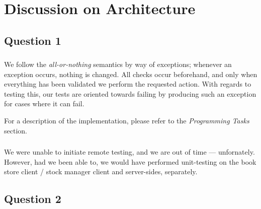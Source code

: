 
\section{Discussion on Architecture}

\subsection{Question 1}

\subsubsection{}
We follow the {\it all-or-nothing} semantics by way of exceptions; whenever an
exception occurs, nothing is changed. All checks occur beforehand, and only when
everything has been validated we perform the requested action. With regards to
testing this, our tests are oriented towards failing by producing such an
exception for cases where it can fail.

For a description of the implementation, please refer to the {\it Programming
Tasks} section.

\subsubsection{}
We were unable to initiate remote testing, and we are out of time --- unfornately.
However, had we been able to, we would have performed unit-testing on the book store
client / stock manager client and server-sides, separately.

\subsection{Question 2}


